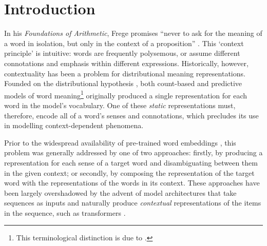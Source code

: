 
\section{Introduction}

In his \emph{Foundations of Arithmetic}, Frege promises ``never to ask for the meaning
of a word in isolation, but only in the context of a proposition''
\parencite*[xvii]{Frege1980}.
This `context principle' is intuitive: words are frequently polysemous, or assume
different connotations and emphasis within different expressions.
Historically, however, contextuality has been a problem for distributional meaning
representations.
Founded on the distributional hypothesis \parencites{Harris1954}{Firth1957}, both
count-based and predictive models of word meaning\footnote{ This terminological
  distinction is due to \textcite{Baroni2014a}.
} originally
produced a single representation for each word in the model's vocabulary.
One of these \emph{static} representations must, therefore, encode all of a word's
senses and connotations, which precludes its use in modelling context-dependent
phenomena.

Prior to the widespread availability of pre-trained word embeddings
\parencites[e.g.,][]{Mikolov2013}{Pennington2014}, this problem was generally addressed
by one of two approaches: firstly, by producing a representation for each sense of a
target word and disambiguating between them in the given context; or secondly, by
composing the representation of the target word with the representations of the words
in its context.
These approaches have been largely overshadowed by the advent of model architectures
that take sequences as inputs and naturally produce \emph{contextual} representations
of the items in the sequence, such as transformers \parencite{Vaswani2017}.


